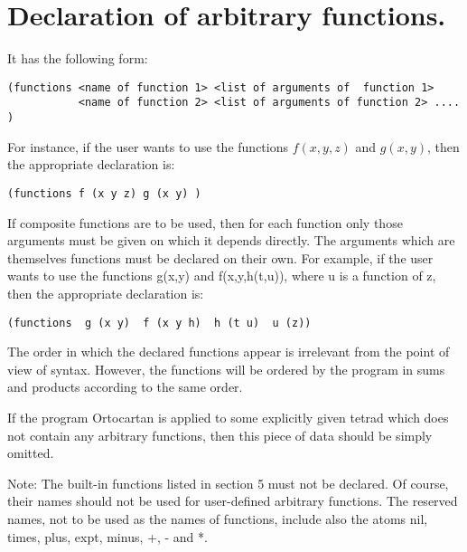 \section{Declaration of arbitrary functions.}

It has the following form:

\bigskip

\begin{verbatim}
(functions <name of function 1> <list of arguments of  function 1>
           <name of function 2> <list of arguments of function 2> .... )
\end{verbatim}

\bigskip

\noindent For instance,  if  the  user  wants  to  use  the  functions
$f(x,y,z)$ and $g(x,y)$, then the appropriate declaration is:

\bigskip

\begin{verbatim}
(functions f (x y z) g (x y) )
\end{verbatim}

\bigskip

If composite functions are to be used,  then  for  each function  only those
arguments must be given on which it depends directly. The arguments which are
themselves functions
     must  be  declared  on  their  own. For example, if the user
     wants to use the functions g(x,y) and f(x,y,h(t,u)), where u
     is a function of z, then the appropriate declaration is:

\bigskip

\begin{verbatim}
(functions  g (x y)  f (x y h)  h (t u)  u (z))
\end{verbatim}

\bigskip

The order in which the declared functions appear is irrelevant  from  the point
of  view of syntax. However, the functions will be ordered by the program in
sums  and  products according to the same order.

If the program Ortocartan is applied to some  explicitly  given  tetrad which
does not contain any arbitrary functions, then this piece of data should be
simply omitted.

Note: The built-in functions listed in section  5  must
     not  be  declared. Of course, their names should not be used
     for user-defined arbitrary functions.  The  reserved  names,
     not  to  be used as the names of functions, include also the
     atoms nil, times, plus, expt, minus, +, - and *.

